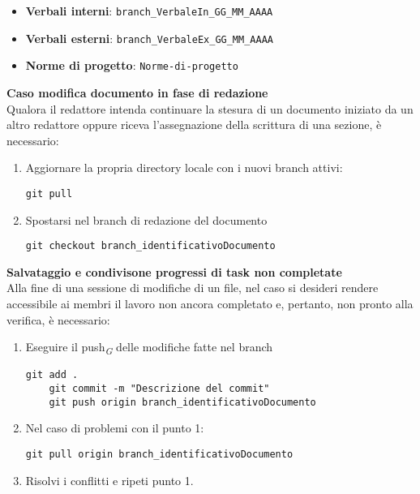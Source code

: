 \documentclass{article}
\begin{document}
    \begin{itemize}
        \item \textbf{Verbali interni}: \verb|branch_VerbaleIn_GG_MM_AAAA|
        \item \textbf{Verbali esterni}: \verb|branch_VerbaleEx_GG_MM_AAAA|
        \item \textbf{Norme di progetto}: \verb|Norme-di-progetto|
    \end{itemize}

    \textbf{Caso modifica documento in fase di redazione}\\
   Qualora il redattore intenda continuare la stesura di un documento iniziato da un altro redattore oppure riceva l'assegnazione della scrittura di una sezione, è necessario:
    
    \begin{enumerate}
        \item Aggiornare la propria directory locale con i nuovi branch attivi:
        \begin{lstlisting}[style=code]
    git pull
        \end{lstlisting}

        \item Spostarsi nel branch di redazione del documento
        \begin{lstlisting}[style=code]
    git checkout branch_identificativoDocumento
        \end{lstlisting}
    \end{enumerate}
     \textbf{Salvataggio e condivisone progressi di task non completate}\\
    Alla fine di una sessione di modifiche di un file, nel caso si desideri rendere accessibile ai membri il lavoro non ancora completato e, pertanto, non pronto alla verifica, è necessario:
    \begin{enumerate}
        \item Eseguire il push\textsubscript{\textit{G}}  delle modifiche fatte nel branch 
        \begin{lstlisting}[style=code]
    git add .
    git commit -m "Descrizione del commit"
    git push origin branch_identificativoDocumento
        \end{lstlisting}

        \item Nel caso di problemi con il punto 1:
        \begin{lstlisting}[style=code]
   git pull origin branch_identificativoDocumento
        \end{lstlisting}
        \item Risolvi i conflitti e ripeti punto 1.
    \end{enumerate}
\end{document}

